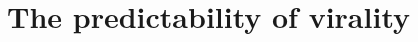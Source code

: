 \documentclass[phd,tocprelim]{cornell}
\begin{document}



\section{The predictability of virality}
\end{document}

